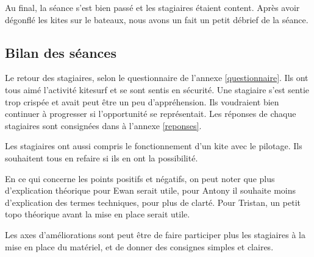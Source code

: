 \documentclass[11pt,a4paper]{report}
\begin{document}
Au final, la séance s'est bien passé et les stagiaires étaient content.
Après avoir dégonflé les kites sur le bateaux, nous avons un fait un
petit débrief de la séance.



\subsection{Bilan des séances}
Le retour des stagiaires, selon le questionnaire de l'annexe \ref{questionnaire}.
Ils ont tous aimé l'activité kitesurf et se sont sentis en sécurité.
Une stagiaire s'est sentie trop crispée et avait peut \^etre un peu d'appréhension.
Ils  voudraient bien continuer à progresser si l'opportunité se représentait.
Les réponses de chaque stagiaires sont consignées dans à l'annexe \ref{reponses}.

Les stagiaires ont aussi compris le fonctionnement d'un kite avec le pilotage.
Ils souhaitent tous en refaire si ils en ont la possibilité.

En ce qui concerne les points positifs et négatifs, on peut noter
que plus d'explication théorique pour Ewan serait utile, pour Antony
il souhaite moins d'explication des termes techniques, pour plus de clarté.
Pour Tristan, un petit topo théorique avant la mise en place serait utile.

Les axes d'améliorations sont peut \^etre de faire participer
plus les stagiaires à la mise en place du matériel, et de
donner des consignes simples et claires. 
\end{document}
